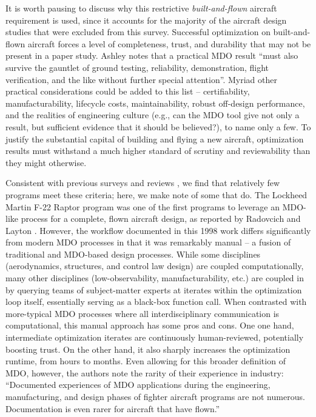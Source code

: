 \documentclass[12pt,vi,oneside]{report}
\begin{document}
    \noindent It is worth pausing to discuss why this restrictive \textit{built-and-flown} aircraft requirement is used, since it accounts for the majority of the aircraft design studies that were excluded from this survey. Successful optimization on built-and-flown aircraft forces a level of completeness, trust, and durability that may not be present in a paper study. Ashley notes that a practical MDO result ``must also survive the gauntlet of ground testing, reliability, demonstration, flight verification, and the like without further special attention''. \cite{ashley_making_1982} Myriad other practical considerations could be added to this list -- certifiability, manufacturability, lifecycle costs, maintainability, robust off-design performance, and the realities of engineering culture (e.g., can the MDO tool give not only a result, but sufficient evidence that it should be believed?), to name only a few. To justify the substantial capital of building and flying a new aircraft, optimization results must withstand a much higher standard of scrutiny and reviewability than they might otherwise.


    Consistent with previous surveys and reviews \cite{kroo_multidisciplinary_1997, agte_mdo_2010, ashley_making_1982, haftka_multidisciplinary_1997,gazaix_industrialization_2017}, we find that relatively few programs meet these criteria; here, we make note of some that do. The Lockheed Martin F-22 Raptor program was one of the first programs to leverage an MDO-like process for a complete, flown aircraft design, as reported by Radovcich and Layton \cite{radovcich_f22_1998}. However, the workflow documented in this 1998 work differs significantly from modern MDO processes in that it was remarkably manual -- a fusion of traditional and MDO-based design processes. While some disciplines (aerodynamics, structures, and control law design) are coupled computationally, many other disciplines (low-observability, manufacturability, etc.) are coupled in by querying teams of subject-matter experts at iterates within the optimization loop itself, essentially serving as a black-box function call. When contrasted with more-typical MDO processes where all interdisciplinary communication is computational, this manual approach has some pros and cons. One one hand, intermediate optimization iterates are continuously human-reviewed, potentially boosting trust. On the other hand, it also sharply increases the optimization runtime, from hours to months. Even allowing for this broader definition of MDO, however, the authors note the rarity of their experience in industry: ``Documented experiences of MDO applications during the engineering, manufacturing, and design phases of fighter aircraft programs are not numerous. Documentation is even rarer for aircraft that have flown.''
\end{document}
